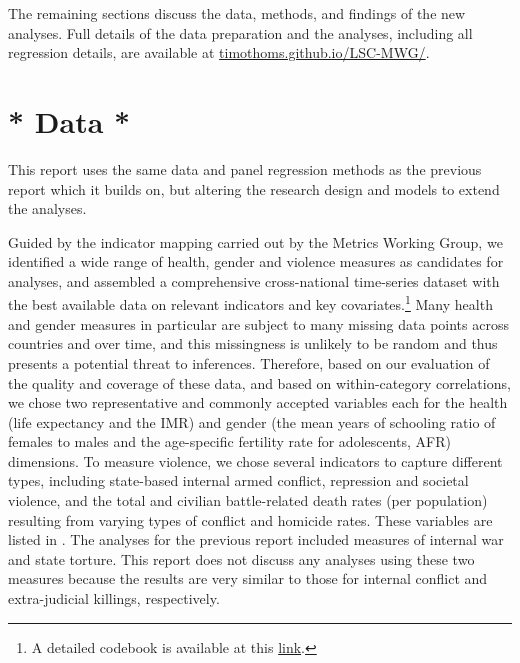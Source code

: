 \documentclass[12pt]{article}
\begin{document}
The remaining sections discuss the data, methods, and findings of the new analyses. Full details of the data preparation and the analyses, including all regression details, are available at \href{https://timothoms.github.io/LSC-MWG/}{timothoms.github.io/LSC-MWG/}.

\section{* Data *}
\label{data}

This report uses the same data and panel regression methods as the previous report which it builds on, but altering the research design and models to extend the analyses.

Guided by the indicator mapping carried out by the Metrics Working Group, we identified a wide range of health, gender and violence measures as candidates for analyses, and assembled a comprehensive cross-national time-series dataset with the best available data on relevant indicators and key covariates.\footnote{A detailed codebook is available at this \href{https://docs.google.com/spreadsheets/d/1KLFTva--XHVBM-IX6qaPtuyzmIlRMnpyjUXfBdJPsag/edit?usp=sharing}{link}.}
Many health and gender measures in particular are subject to many missing data points across countries and over time, and this missingness is unlikely to be random and thus presents a potential threat to inferences. Therefore, based on our evaluation of the quality and coverage of these data, and based on within-category correlations, we chose two representative and commonly accepted variables each for the health (life expectancy and the IMR) and gender (the mean years of schooling ratio of females to males and the age-specific fertility rate for adolescents, AFR) dimensions.
To measure violence, we chose several indicators to capture different types, including state-based internal armed conflict, repression and societal violence, and the total and civilian battle-related death rates (per population) resulting from varying types of conflict and homicide rates.
These variables are listed in . The analyses for the previous report included measures of internal war and state torture. This report does not discuss any analyses using these two measures because the results are very similar to those for internal conflict and extra-judicial killings, respectively.


\end{document}
